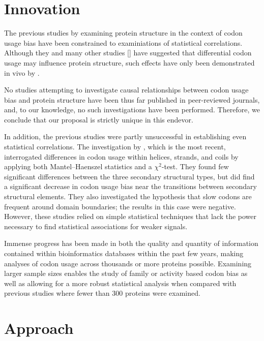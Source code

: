 \documentclass[11pt]{nih}
\begin{document}
\section{Innovation}

The previous studies by \citet{Saunders2010,Biro2006,Adzhubei1996,Gu2003} examining protein structure in the context of codon usage bias have been constrained to examiniations of statistical correlations. Although they and many other studies [] have suggested that differential codon usage may influence protein structure, such effects have only been demonstrated in vivo by \citet{Zhou2013,Sarfaty2007}.

No studies attempting to investigate causal relationships between codon usage bias and protein structure have been thus far published in peer-reviewed journals, and, to our knowledge, no such investigations have been performed. Therefore, we conclude that our proposal is strictly unique in this endevor.

In addition, the previous studies were partly unsuccessful in establishing even statistical correlations. The investigation by \citet{Saunders2010}, which is the most recent, interrogated differences in codon usage  within helices, strands, and coils by applying both Mantel--Haenszel statistics and a $\chi^2$-test. They found few significant differences between the three secondary structural types, but did find a significant decrease in codon usage bias near the transitions between secondary structural elements. They also investigated the hypothesis that slow codons are frequent around domain boundaries; the results in this case were negative. However, these studies relied on simple statistical techniques that lack the power necessary to find statistical associations for weaker signals.

Immense progress has been made in both the quality and quantity of information contained within bioinformatics databases within the past few years, making analyses of codon usage across thousands or more proteins possible. Examining larger sample sizes enables the study of family or activity based codon bias as well as allowing for a more robust statistical analysis when compared with previous studies where fewer than 300 proteins were examined.

\section{Approach}
\end{document}
